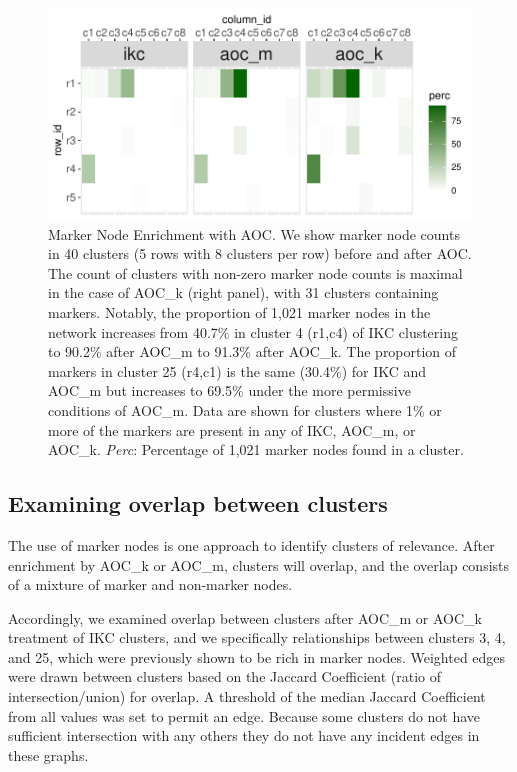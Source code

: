 \documentclass[12pt, oneside]{article}   	%
\begin{document}
 \begin{figure}[H]
\centering
\includegraphics[width=0.7\linewidth]{bl_marker_comps_wide.pdf} 
\captionsetup{width=0.9\textwidth}
\caption{Marker Node Enrichment with AOC. We show marker node counts in 40 clusters (5 rows with 8 clusters per row) before and after AOC.  The count of clusters with non-zero marker node counts is maximal in the case of AOC\_k (right panel), with 31 clusters containing markers. Notably, the proportion of 1,021 marker nodes in the network increases from 40.7\% in cluster 4 (r1,c4) of IKC clustering to 90.2\% after AOC\_m to 91.3\% after AOC\_k. The proportion of markers in cluster 25 (r4,c1) is the same (30.4\%) for IKC and AOC\_m but increases to  69.5\% under the more permissive conditions of AOC\_m. Data are shown for clusters where 1\% or more of the markers are present in any of IKC, AOC\_m, or AOC\_k. \emph{Perc}: Percentage of 1,021 marker nodes found in a cluster.}
\label{fig:marker-node-concentration}
\end{figure}
	
\clearpage
	
\subsection{Examining overlap between clusters}

The use of marker nodes is one approach to identify clusters of relevance. After enrichment by AOC\_k or AOC\_m, clusters will overlap, and the overlap consists of 
a mixture of marker and non-marker nodes.   

Accordingly, we examined overlap between clusters after AOC\_m or AOC\_k treatment of IKC clusters, and we specifically relationships between clusters 3, 4, and 25, which were previously shown to be rich in marker nodes. Weighted edges were drawn between clusters based on the Jaccard Coefficient (ratio of intersection/union) for overlap. A threshold of the median Jaccard Coefficient from all values was set to permit an edge. Because some clusters do not have sufficient intersection with any others  they do not have any incident edges in these graphs.
\end{document}
